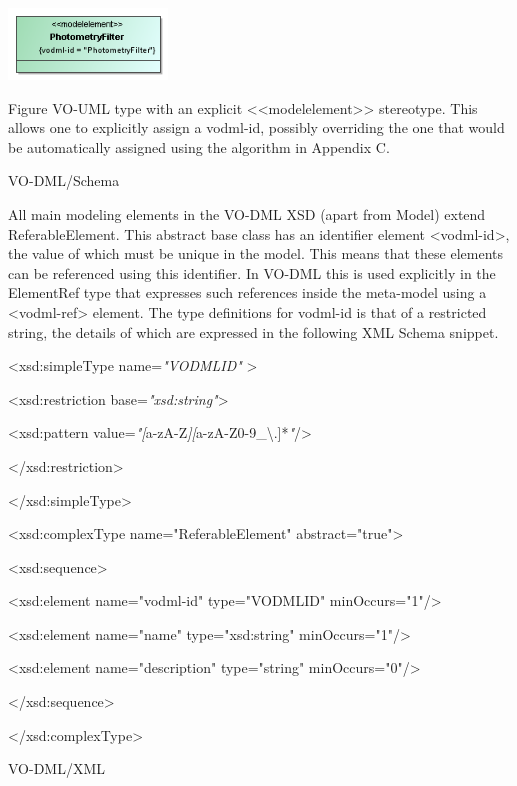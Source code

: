 \documentclass[10pt,a4paper]{ivoa}
\begin{document}
\includegraphics[width=1.66667in,height=0.75in]{./media/image7.png}

Figure VO-UML type with an explicit
\textless\textless modelelement\textgreater\textgreater{} stereotype.
This allows one to explicitly assign a vodml-id, possibly overriding the
one that would be automatically assigned using the algorithm in Appendix
C.

VO-DML/Schema

All main modeling elements in the VO-DML XSD (apart from Model) extend
ReferableElement. This abstract base class has an identifier element
\textless vodml-id\textgreater, the value of which must be unique in the
model. This means that these elements can be referenced using this
identifier. In VO-DML this is used explicitly in the ElementRef type
that expresses such references inside the meta-model using a
\textless vodml-ref\textgreater{} element. The type definitions for
vodml-id is that of a restricted string, the details of which are
expressed in the following XML Schema snippet.

\textless xsd:simpleType name=\emph{"VODMLID"} \textgreater{}

\textless xsd:restriction base=\emph{"xsd:string"}\textgreater{}

\textless xsd:pattern
value=\emph{"{[}}a-zA-Z\emph{{]}{[}}a-zA-Z0-9\_\textbackslash.{]}*\emph{"}/\textgreater{}

\textless/xsd:restriction\textgreater{}

\textless/xsd:simpleType\textgreater{}

\textless xsd:complexType name="ReferableElement"
abstract="true"\textgreater{}

\textless xsd:sequence\textgreater{}

\textless xsd:element name="vodml-id" type="VODMLID"
minOccurs="1"/\textgreater{}

\textless xsd:element name="name" type="xsd:string"
minOccurs="1"/\textgreater{}

\textless xsd:element name="description" type="string"
minOccurs="0"/\textgreater{}

\textless/xsd:sequence\textgreater{}

\textless/xsd:complexType\textgreater{}

VO-DML/XML
\end{document}
